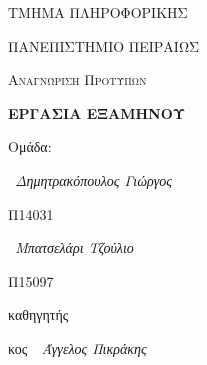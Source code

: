 \begin{titlepage}

\centering
{\scshape\LARGE ΤΜΗΜΑ ΠΛΗΡΟΦΟΡΙΚΗΣ\par ΠΑΝΕΠΙΣΤΗΜΙΟ ΠΕΙΡΑΙΩΣ \par}
\vspace{1cm}
{\scshape\Large Αναγνώριση Προτύπων\par}
\vspace{1.5cm}

{\huge\bfseries ΕΡΓΑΣΙΑ ΕΞΑΜΗΝΟΥ\par}
\vspace{2cm}
{\Large{Ομάδα:}}\par
\vspace{.5 cm}
{\large{\itshape\ Δημητρακόπουλος Γιώργος\/\par} Π14031 \par }
\vspace{.5 cm}
{\large{\itshape\ Μπατσελάρι Τζούλιο\/\par} Π15097 \par }
\vfill
καθηγητής\par
{\small κος}~{\itshape\ Άγγελος Πικράκης\/}

\vfill


\end{titlepage}
